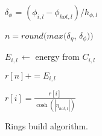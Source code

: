 \begin{algorithm}[H]
{        $\delta_{\phi}$ = $(\phi_{i,l}-\phi_{hot,l})/h_{\phi,l}$

        $n = round(max(\delta_{\eta}$, $\delta_{\phi}))$
                
        {
            $E_{i,l} \, \leftarrow$ energy from $C_{i,l}$

            $r[n] += E_{i,l}$

        }  
    }
    
    {
        $r[i] = \frac{r[i]}{\cosh(|\eta_{hot,l}|)}$
    }



\caption{Rings build algorithm.}
\end{algorithm}

